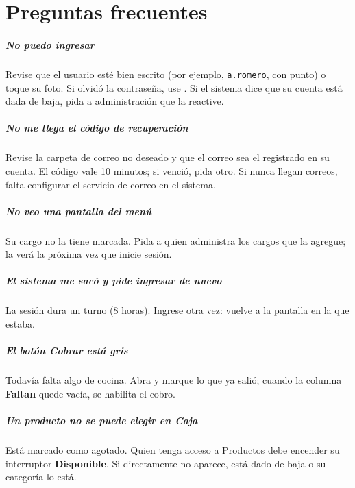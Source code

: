 \chapter{Preguntas frecuentes}

\paragraph{No puedo ingresar} Revise que el usuario esté bien escrito (por ejemplo, \texttt{a.romero}, con punto) o toque su foto. Si olvidó la contraseña, use . Si el sistema dice que su cuenta está dada de baja, pida a administración que la reactive.

\paragraph{No me llega el código de recuperación} Revise la carpeta de correo no deseado y que el correo sea el registrado en su cuenta. El código vale 10 minutos; si venció, pida otro. Si nunca llegan correos, falta configurar el servicio de correo en el sistema.

\paragraph{No veo una pantalla del menú} Su cargo no la tiene marcada. Pida a quien administra los cargos que la agregue; la verá la próxima vez que inicie sesión.

\paragraph{El sistema me sacó y pide ingresar de nuevo} La sesión dura un turno (8 horas). Ingrese otra vez: vuelve a la pantalla en la que estaba.

\paragraph{El botón Cobrar está gris} Todavía falta algo de cocina. Abra  y marque lo que ya salió; cuando la columna \textbf{Faltan} quede vacía, se habilita el cobro.

\paragraph{Un producto no se puede elegir en Caja} Está marcado como agotado. Quien tenga acceso a Productos debe encender su interruptor \textbf{Disponible}. Si directamente no aparece, está dado de baja o su categoría lo está.

